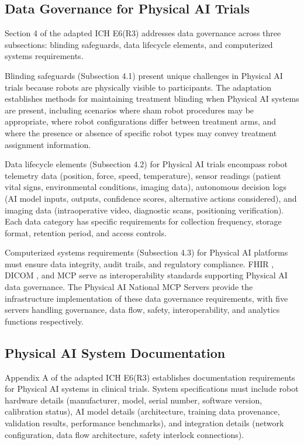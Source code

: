 \subsection{Data Governance for Physical AI Trials}
\label{subsec:ich-data-governance}

Section 4 of the adapted ICH E6(R3) addresses data governance across three
subsections: blinding safeguards, data lifecycle elements, and computerized
systems requirements.

Blinding safeguards (Subsection 4.1) present unique challenges in Physical AI
trials because robots are physically visible to participants. The adaptation
establishes methods for maintaining treatment blinding when Physical AI systems
are present, including scenarios where sham robot procedures may be appropriate,
where robot configurations differ between treatment arms, and where the presence
or absence of specific robot types may convey treatment assignment information.

Data lifecycle elements (Subsection 4.2) for Physical AI trials encompass robot
telemetry data (position, force, speed, temperature), sensor readings (patient
vital signs, environmental conditions, imaging data), autonomous decision logs
(AI model inputs, outputs, confidence scores, alternative actions considered),
and imaging data (intraoperative video, diagnostic scans, positioning
verification). Each data category has specific requirements for collection
frequency, storage format, retention period, and access controls.

Computerized systems requirements (Subsection 4.3) for Physical AI platforms
must ensure data integrity, audit trails, and regulatory compliance. FHIR
\cite{hl7-fhir}, DICOM \cite{dicom}, and MCP \cite{mcp-protocol} serve as
interoperability standards supporting Physical AI data governance. The Physical
AI National MCP Servers \cite{national-mcp-paper} provide the infrastructure
implementation of these data governance requirements, with five servers handling
governance, data flow, safety, interoperability, and analytics functions
respectively.

\subsection{Physical AI System Documentation}
\label{subsec:ich-documentation}

Appendix A of the adapted ICH E6(R3) establishes documentation requirements for
Physical AI systems in clinical trials. System specifications must include robot
hardware details (manufacturer, model, serial number, software version,
calibration status), AI model details (architecture, training data provenance,
validation results, performance benchmarks), and integration details (network
configuration, data flow architecture, safety interlock connections).

